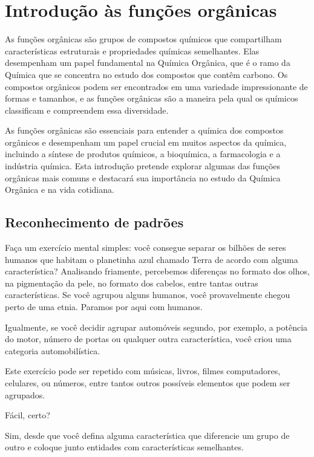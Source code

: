 \chapter{Introdução às funções orgânicas}
\begin{mdframed}[backgroundcolor=orange!20,linewidth=0pt,roundcorner=10pt]
	\minitoc
\end{mdframed}
As funções orgânicas são grupos de compostos químicos que compartilham características estruturais e propriedades químicas semelhantes. Elas desempenham um papel fundamental na Química Orgânica, que é o ramo da Química que se concentra no estudo dos compostos que contêm carbono. Os compostos orgânicos podem ser encontrados em uma variedade impressionante de formas e tamanhos, e as funções orgânicas são a maneira pela qual os químicos classificam e compreendem essa diversidade.

As funções orgânicas são essenciais para entender a química dos compostos orgânicos e desempenham um papel crucial em muitos aspectos da química, incluindo a síntese de produtos químicos, a bioquímica, a farmacologia e a indústria química. Esta introdução pretende explorar algumas das funções orgânicas mais comuns e destacará sua importância no estudo da Química Orgânica e na vida cotidiana.


\section{Reconhecimento de padrões}
Faça um exercício mental simples: você consegue separar os bilhões de seres humanos que habitam o planetinha azul chamado Terra de acordo com alguma característica? Analisando friamente, percebemos diferenças no formato dos olhos, na pigmentação da pele, no formato dos cabelos, entre tantas outras características. Se você agrupou alguns humanos, você provavelmente chegou perto de uma etnia. Paramos por aqui com humanos.

Igualmente, se você decidir agrupar automóveis segundo, por exemplo, a potência do motor, número de portas ou qualquer outra característica, você criou uma categoria automobilística.

Este exercício pode ser repetido com músicas, livros, filmes computadores, celulares, ou números, entre tantos outros possíveis elementos que podem ser agrupados.

Fácil, certo?

Sim, desde que você defina alguma característica que diferencie um grupo de outro e coloque junto entidades com características semelhantes.

